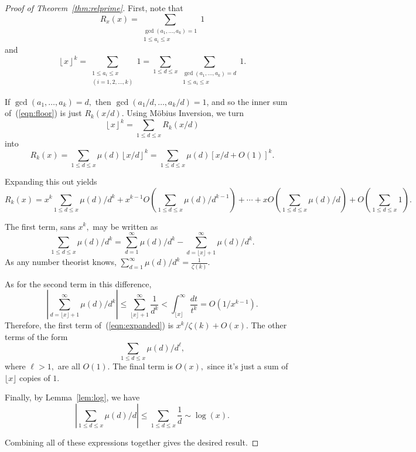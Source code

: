 \documentclass[11pt]{article}
\newcommand{\refn}[1]{\textnormal{(\ref{#1})}}
\newcommand{\abs}[1]{\left|#1\right|}
\begin{document}
\begin{proof}[Proof of Theorem~\ref{thm:relprime}]
First, note that \begin{equation}\label{eqn:countrel} R_{x}\left(x\right) = \sum_{\substack{\gcd\left(a_{1},\ldots,a_{k}\right) = 1 \\ 1\leq a_{i}\leq x}} 1\end{equation} and \begin{equation}\label{eqn:floor} \left\lfloor x\right\rfloor^{k} = \sum_{\substack{1\leq a_{i}\leq x\\ \left(i = 1,2,\ldots,k\right)}} 1 = \sum_{1\leq d\leq x} \sum_{\substack{\gcd\left(a_{1},\ldots,a_{k}\right) = d \\ 1\leq a_{i}\leq x}} 1.\end{equation}

If $\gcd\left(a_{1},\ldots,a_{k}\right) = d,$ then $\gcd\left(a_{1}/d,\ldots,a_{k}/d\right) = 1$, and so the inner sum of~\refn{eqn:floor} is just $R_{k}\left(x/d\right).$ Using M\"{o}bius Inversion, we turn \begin{equation}\left\lfloor x\right\rfloor^{k} = \sum_{1\leq d\leq x} R_{k}\left(x/d\right)\end{equation} into \begin{equation}\label{eqn:inverted} R_{k}\left(x\right) = \sum_{1\leq d\leq x} \mu\left(d\right) \left\lfloor x/d\right\rfloor^{k} = \sum_{1\leq d\leq x} \mu\left(d\right) \left[ x/d + O\left(1\right)\right]^{k}.\end{equation}

Expanding this out yields \begin{equation}\label{eqn:expanded} R_{k}\left(x\right) = x^{k}\sum_{1\leq d\leq x} \mu\left(d\right)/d^{k} + x^{k-1} O\left(\sum_{1\leq d\leq x} \mu\left(d\right)/d^{k-1}\right) + \cdots + x O\left(\sum_{1\leq d\leq x} \mu\left(d\right)/d\right) + O\left(\sum_{1\leq d\leq x} 1\right).\end{equation}

The first term, sans $x^{k},$ may be written as $$\sum_{1\leq d\leq x} \mu\left(d\right)/d^{k} = \sum_{d = 1}^{\infty} \mu\left(d\right)/d^{k} - \sum_{d = \lfloor x\rfloor + 1}^{\infty}  \mu\left(d\right)/d^{k}.$$ As any number theorist knows, $\displaystyle{\sum_{d = 1}^{\infty} \mu\left(d\right)/d^{k} = \frac{1}{\zeta\left(k\right)}}.$

As for the second term in this difference, $$\abs{\sum_{d = \lfloor x\rfloor + 1}^{\infty}  \mu\left(d\right)/d^{k}}\leq \sum_{\lfloor x\rfloor + 1}^{\infty}\frac{1}{d^{k}} < \int_{\lfloor x\rfloor}^{\infty} \frac{dt}{t^{k}} = O\left(1/x^{k-1}\right).$$ Therefore, the first term of~\refn{eqn:expanded} is $x^{k}/\zeta\left(k\right) + O\left(x\right).$ The other terms of the form $$\sum_{1\leq d\leq x}\mu\left(d\right)/d^{\ell},$$ where $\ell > 1,$ are all $O\left(1\right)$. The final term is $O\left(x\right),$ since it's just a sum of $\lfloor x\rfloor$ copies of $1.$

Finally, by Lemma~\ref{lem:log}, we have$$\abs{\sum_{1\leq d\leq x}  \mu\left(d\right)/d} \leq \sum_{1\leq d\leq x} \frac{1}{d} \sim \log\left(x\right).$$

Combining all of these expressions together gives the desired result.
\end{proof}
\end{document}
